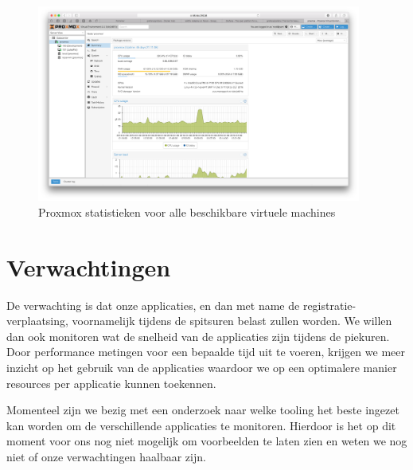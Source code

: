\begin{figure}[H]
	\centering
	\includegraphics[width=0.95\textwidth]{img/proxmox.png}
	\caption{Proxmox statistieken voor alle beschikbare virtuele machines}
	\label{fig:proxmox}
\end{figure}

\section{Verwachtingen}
De verwachting is dat onze applicaties, en dan met name de registratie-verplaatsing, voornamelijk tijdens de spitsuren belast zullen worden. We willen dan ook monitoren wat de snelheid van de applicaties zijn tijdens de piekuren. Door performance metingen voor een bepaalde tijd uit te voeren, krijgen we meer inzicht op het gebruik van de applicaties waardoor we op een optimalere manier resources per applicatie kunnen toekennen. 

Momenteel zijn we bezig met een onderzoek naar welke tooling het beste ingezet kan worden om de verschillende applicaties te monitoren. Hierdoor is het op dit moment voor ons nog niet mogelijk om voorbeelden te laten zien en weten we nog niet of onze verwachtingen haalbaar zijn.
